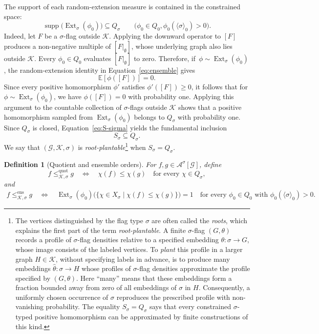 \documentclass{article}
\newtheorem{definition}[definition]{Definition}
\newcommand{\FlagAlg}[1]{\mathcal{A}^{#1}}
\newcommand{\Ext}{\operatorname{Ext}}
\begin{document}
The support of each random-extension measure is contained in the constrained
space:
\[
  \operatorname{supp}\bigl(\Ext_\sigma(\phi_0)\bigr)
  \subseteq Q_\sigma
  \qquad
  \bigl(\phi_0\in Q_0,
        \phi_0(\langle\sigma\rangle_0)>0\bigr).
\]
Indeed, let \(F\) be a \(\sigma\)-flag outside \(\mathcal K\).  Applying the
downward operator to \([F]\) produces a non-negative multiple of
\([F|_\emptyset]\), whose underlying graph also lies outside \(\mathcal K\).
Every \(\phi_0\in Q_0\) evaluates \([F|_\emptyset]\) to zero.  Therefore, if~\(\phi\sim\Ext_\sigma(\phi_0)\), the random-extension
identity in Equation~\eqref{eq:ensemble} gives
\[
  \mathbb{E}[\phi([F])]=0.
\]
Since every positive homomorphism \(\phi'\) satisfies \(\phi'([F])\geq0\), it
follows that for \(\phi\sim\Ext_\sigma(\phi_0)\), we have
\(\phi([F])=0\) with probability one.  Applying this argument to
the countable collection of \(\sigma\)-flags outside \(\mathcal K\) shows that a positive
homomorphism sampled from \(\Ext_\sigma(\phi_0)\) belongs to \(Q_\sigma\) with
probability one.  Since \(Q_\sigma\) is closed, Equation~\eqref{eq:S-sigma} yields the
fundamental inclusion
\begin{equation}\label{eq:S-subset-Q}
  S_\sigma\subseteq Q_\sigma.
\end{equation}
We say that \((\mathcal G,\mathcal K,\sigma)\) is
\emph{root-plantable}\footnote{The vertices distinguished by the flag type
\(\sigma\) are often called the \emph{roots}, which explains the first part of
the term \emph{root-plantable}.  A finite \(\sigma\)-flag \((G,\theta)\)
records a profile of \(\sigma\)-flag densities relative to a specified embedding
\(\theta:\sigma\to G\), whose image consists of the labeled vertices.  To
\emph{plant} this profile in a larger graph \(H\in\mathcal K\), without
specifying labels in advance, is to produce many embeddings
\(\widehat\theta:\sigma\to H\) whose profiles of \(\sigma\)-flag densities approximate the
profile specified by \((G,\theta)\).  Here ``many'' means that these embeddings
form a fraction bounded away from zero of all embeddings of \(\sigma\) in
\(H\).  Consequently, a uniformly chosen occurrence of \(\sigma\) reproduces
the prescribed profile with non-vanishing probability.  The equality
\(S_\sigma=Q_\sigma\) says that every constrained \(\sigma\)-typed positive
homomorphism can be approximated by finite constructions of this kind.} when
\(S_\sigma=Q_\sigma\).

\begin{definition}[Quotient and ensemble orders]\label{def:two-constrained-orders}
For \(f,g\in\FlagAlg{\sigma}[\mathcal G]\), define
\[
  f\leq^{\mathrm{quot}}_{\mathcal K,\sigma}g
  \quad\Longleftrightarrow\quad
  \chi(f)\leq\chi(g)
  \quad\text{for every }\chi\in Q_\sigma,
\]
and
\[
\begin{aligned}
  f\leq^{\mathrm{ens}}_{\mathcal K,\sigma}g
  \quad\Longleftrightarrow\quad
  \Ext_\sigma(\phi_0)
  \bigl(\{\chi\in X_\sigma\mid \chi(f)\leq\chi(g)\}\bigr)=1
  \quad\text{for every }\phi_0\in Q_0\text{ with }
  \phi_0(\langle\sigma\rangle_0)>0.
\end{aligned}
\]
\end{definition}
\end{document}
